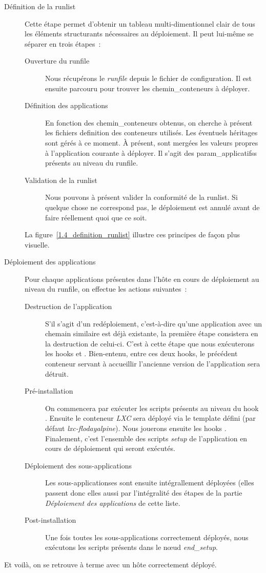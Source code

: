 \begin{description}
	\item[Définition de la \gls{runlist}]
		Cette étape permet d'obtenir un tableau multi-dimentionnel clair de tous les éléments structurants nécessaires au déploiement.
		Il peut lui-même se séparer en trois étapes~:
		\begin{description}
			\item[Ouverture du \gls{runfile}]
				Nous récupérons le \emph{runfile} depuis le fichier de configuration.
				Il est ensuite parcouru pour trouver les \glspl{chemin_conteneur} à déployer.
			\item[Définition des applications]
				En fonction des \glspl{chemin_conteneur} obtenus, on cherche à présent les fichiers \gls{definition} des conteneurs utilisés.
				Les éventuels héritages sont gérés à ce moment.
				À présent, sont mergées les valeurs propres à l'application courante à déployer.
				Il s'agit des \glspl{param_applicatifs} présents au niveau du runfile.
			\item[Validation de la runlist]
				Nous pouvons à présent valider la conformité de la \gls{runlist}.
				Si quelque chose ne correspond pas, le déploiement est annulé avant de faire réellement quoi que ce soit.
		\end{description}
		La figure~\ref{1.4_definition_runlist} illustre ces principes de façon plus visuelle.
	\item[Déploiement des applications]
		Pour chaque applications présentes dans l'hôte en cours de déploiement au niveau du runfile, on effectue les actions suivantes~:
			\begin{description}
				\item[Destruction de l'application]
					S'il s'agit d'un redéploiement, c'est-à-dire qu'une application avec un chemain similaire est déjà existante, la première étape consistera en la destruction de celui-ci.
					C'est à cette étape que nous exécuterons les hooks  et . Bien-entenu, entre ces deux hooks, le précédent conteneur servant à accueillir l'ancienne version de l'application sera détruit.
				\item[Pré-installation]
					On commencera par exécuter les scripts présents au niveau du hook .
					Ensuite le conteneur \emph{LXC} sera déployé via le template défini (par défaut \emph{lxc-flodayalpine}). Nous jouerons ensuite les hooks .
					Finalement, c'est l'ensemble des scripts \emph{setup} de l'application en cours de déploiement qui seront exécutés.
				\item[Déploiement des sous-applications]
					Les \glspl{sous-application}es sont ensuite intégrallement déployées (elles passent donc elles aussi par l'intégralité des étapes de la partie \emph{Déploiement des applications} de cette liste.
				\item[Post-installation]
					Une fois toutes les sous-applications correctement déployés, nous exécutons les scripts présents dans le nœud \emph{end\_setup}.
			\end{description}
\end{description}
Et voilà, on se retrouve à terme avec un hôte correctement déployé.

